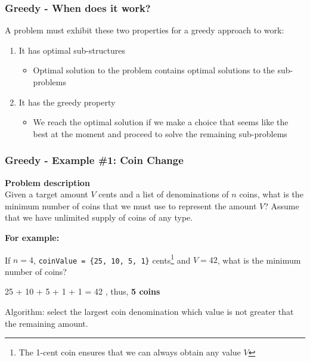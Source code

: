 \documentclass{beamer}
\begin{document}
\begin{frame}[fragile]
\frametitle{Greedy - When does it work?}

A problem must exhibit these two properties for a greedy approach to work:

\begin{enumerate}
    \item It has optimal sub-structures
    	\begin{itemize}
		    \item Optimal solution to the problem contains optimal solutions to the sub-problems
		\end{itemize}
    \item It has the greedy property
    	\begin{itemize}
		    \item We reach the optimal solution if we make a choice that seems like the best at the moment and proceed to solve the remaining sub-problems
		\end{itemize}
\end{enumerate}

\end{frame}

\begin{frame}[fragile]
\frametitle{Greedy - Example \#1: Coin Change}

\color{red}\textbf{Problem description}\color{black} \\

Given a target amount $V$ cents and a list of denominations of $n$ coins, what is the minimum number of coins that we must use to represent the amount $V$? Assume that we have unlimited supply of coins of any type.

\vspace{0.3cm}

\textbf{For example:} \\
\vspace{0.2cm} 

\hspace{0.3cm} If $n=4$, \verb|coinValue = {25, 10, 5, 1}| cents\footnote{The 1-cent coin ensures that we can always obtain any value $V$} and $V=42$, what is the minimum number of coins? \\

\vspace{0.3cm}

\hspace{0.3cm} \color{blue}25 + 10 + 5 + 1 + 1 = 42 \color{black}, thus, \textbf{5 coins}

\vspace{0.3cm}

\hspace{0.3cm} Algorithm: select the largest coin denomination which value is not greater that the remaining amount. 

\end{frame}
\end{document}
